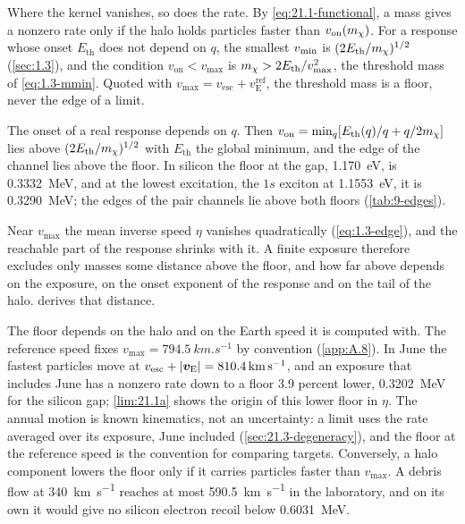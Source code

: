 Where the kernel vanishes, so does the rate. By \cref{eq:21.1-functional}, a mass gives a nonzero rate only if the halo holds particles faster than $v_{\mathrm{on}}(m_{\chi})$. For a response whose onset $E_{\mathrm{th}}$ does not depend on $q$, the smallest $v_{\mathrm{min}}$ is $(2E_{\mathrm{th}}/m_{\chi})^{1/2}$ (\cref{sec:1.3}), and the condition $v_{\mathrm{on}} < v_{\mathrm{max}}$ is $m_{\chi} > 2E_{\mathrm{th}}/v_{\mathrm{max}}^2$, the threshold mass of \cref{eq:1.3-mmin}. Quoted with $v_{\mathrm{max}} = v_{\mathrm{esc}} + v_{\mathrm{E}}^{\mathrm{ref}}$, the threshold mass is a floor, never the edge of a limit.

The onset of a real response depends on $q$. Then $v_{\mathrm{on}} = \min_q[E_{\mathrm{th}}(q)/q + q/2m_{\chi}]$ lies above $(2E_{\mathrm{th}}/m_{\chi})^{1/2}$ with $E_{\mathrm{th}}$ the global minimum, and the edge of the channel lies above the floor. In silicon the floor at the gap, \SI{1.170}{eV}, is \SI{0.3332}{MeV}, and at the lowest excitation, the $1s$ exciton at \SI{1.1553}{eV}, it is \SI{0.3290}{MeV}; the edges of the pair channels lie above both floors (\cref{tab:9-edges}).

Near $v_{\mathrm{max}}$ the mean inverse speed $\eta$ vanishes quadratically (\cref{eq:1.3-edge}), and the reachable part of the response shrinks with it. A finite exposure therefore excludes only masses some distance above the floor, and how far above depends on the exposure, on the onset exponent of the response and on the tail of the halo.  derives that distance.

The floor depends on the halo and on the Earth speed it is computed with. The reference speed fixes $v_{\mathrm{max}} = \SI{794.5}{km.s^{-1}}$ by convention (\cref{app:A.8}). In June the fastest particles move at $v_{\mathrm{esc}} + |\bm{v}_{\mathrm{E}}| = \SI{810.4}{km.s^{-1}}$, and an exposure that includes June has a nonzero rate down to a floor 3.9 percent lower, \SI{0.3202}{MeV} for the silicon gap; \cref{lim:21.1a} shows the origin of this lower floor in $\eta$. The annual motion is known kinematics, not an uncertainty: a limit uses the rate averaged over its exposure, June included (\cref{sec:21.3-degeneracy}), and the floor at the reference speed is the convention for comparing targets. Conversely, a halo component lowers the floor only if it carries particles faster than $v_{\mathrm{max}}$. A debris flow at \SI{340}{km.s^{-1}} reaches at most \SI{590.5}{km.s^{-1}} in the laboratory, and on its own it would give no silicon electron recoil below \SI{0.6031}{MeV}.

